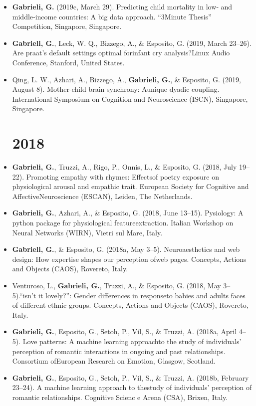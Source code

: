 \documentclass[10pt,a4paper]{altacv}
\begin{document}
\begin{fullwidth}
\begin{itemize}
 \item  \textbf{Gabrieli, G.} (2019c, March 29). Predicting child mortality in low‐ and middle‐income countries: A big data approach. “3Minute Thesis” Competition, Singapore, Singapore.
 \item  \textbf{Gabrieli, G.}, Leck, W. Q., Bizzego, A., \& Esposito, G. (2019, March 23–26). Are praat’s default settings optimal forinfant cry analysis?Linux Audio Conference, Stanford, United States.
 \item Qing, L. W., Azhari, A., Bizzego, A., \textbf{Gabrieli, G.}, \& Esposito, G. (2019, August 8). Mother‐child brain synchrony: Aunique dyadic coupling. International Symposium on Cognition and Neuroscience (ISCN), Singapore, Singapore.

\section*{2018}
 \item  \textbf{Gabrieli, G.}, Truzzi, A., Rigo, P., Onnis, L., \& Esposito, G. (2018, July 19–22). Promoting empathy with rhymes: Effectsof poetry exposure on physiological arousal and empathic trait. European Society for Cognitive and AffectiveNeuroscience (ESCAN), Leiden, The Netherlands.
 \item  \textbf{Gabrieli, G.}, Azhari, A., \& Esposito, G. (2018, June 13–15). Pysiology: A python package for physiological featureextraction. Italian Workshop on Neural Networks (WIRN), Vietri sul Mare, Italy.
 \item  \textbf{Gabrieli, G.}, \& Esposito, G. (2018a, May 3–5). Neuroaesthetics and web design: How expertise shapes our perception ofweb pages. Concepts, Actions and Objects (CAOS), Rovereto, Italy.
 \item Venturoso, L., \textbf{Gabrieli, G.}, Truzzi, A., \& Esposito, G. (2018, May 3–5).“isn’t it lovely?”: Gender differences in responseto babies and adults faces of different ethnic groups. Concepts, Actions and Objects (CAOS), Rovereto, Italy.
 \item  \textbf{Gabrieli, G.}, Esposito, G., Setoh, P., Vil, S., \& Truzzi, A. (2018a, April 4–5). Love patterns: A machine learning approachto the study of individuals’ perception of romantic interactions in ongoing and past relationships. Consortium ofEuropean Research on Emotion, Glasgow, Scotland.
 \item  \textbf{Gabrieli, G.}, Esposito, G., Setoh, P., Vil, S., \& Truzzi, A. (2018b, February 23–24). A machine learning approach to thestudy of individuals’ perception of romantic relationships. Cognitive Scienc e Arena (CSA), Brixen, Italy.

\end{itemize}
\end{fullwidth}
\end{document}
